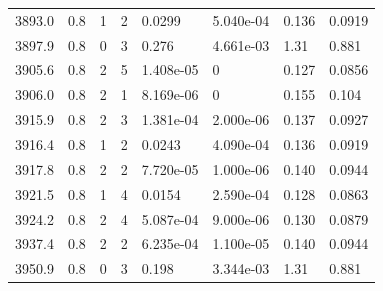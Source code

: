 \documentclass[preview]{standalone}
\begin{document}
{{{{{{{{{{{{{{{\begin{tabular}{L{1.2cm}C{1.2cm} C{0.3cm}C{0.5cm} C{1.4cm}C{1.4cm} C{1.4cm}C{1.4cm}}
  3893.0  &   0.8  & 1     &  2 &  0.0299  & 5.040e-04  & 0.136 &  0.0919   \\ 
  3897.9  &   0.8  & 0     &  3 &  0.276  & 4.661e-03  & 1.31 &  0.881   \\ 
  3905.6  &   0.8  & 2     &  5 &  1.408e-05  & 0  & 0.127 &  0.0856   \\ 
  3906.0  &   0.8  & 2     &  1 &  8.169e-06  & 0  & 0.155 &  0.104   \\ 
  3915.9  &   0.8  & 2     &  3 &  1.381e-04  & 2.000e-06  & 0.137 &  0.0927   \\ 
  3916.4  &   0.8  & 1     &  2 &  0.0243  & 4.090e-04  & 0.136 &  0.0919   \\ 
  3917.8  &   0.8  & 2     &  2 &  7.720e-05  & 1.000e-06  & 0.140 &  0.0944   \\ 
  3921.5  &   0.8  & 1     &  4 &  0.0154  & 2.590e-04  & 0.128 &  0.0863   \\ 
  3924.2  &   0.8  & 2     &  4 &  5.087e-04  & 9.000e-06  & 0.130 &  0.0879   \\ 
  3937.4  &   0.8  & 2     &  2 &  6.235e-04  & 1.100e-05  & 0.140 &  0.0944   \\ 
  3950.9  &   0.8  & 0     &  3 &  0.198  & 3.344e-03  & 1.31 &  0.881   \\ 
\hline 
\end{tabular} 

}}}}}}}}}}}}}}}
\end{document}
